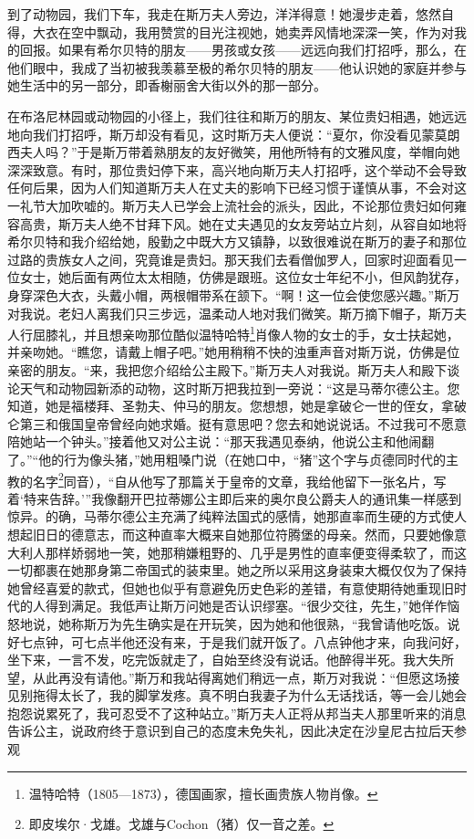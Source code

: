 \par 到了动物园，我们下车，我走在斯万夫人旁边，洋洋得意！她漫步走着，悠然自得，大衣在空中飘动，我用赞赏的目光注视她，她卖弄风情地深深一笑，作为对我的回报。如果有希尔贝特的朋友——男孩或女孩——远远向我们打招呼，那么，在他们眼中，我成了当初被我羡慕至极的希尔贝特的朋友——他认识她的家庭并参与她生活中的另一部分，即香榭丽舍大街以外的那一部分。
\par 在布洛尼林园或动物园的小径上，我们往往和斯万的朋友、某位贵妇相遇，她远远地向我们打招呼，斯万却没有看见，这时斯万夫人便说：“夏尔，你没看见蒙莫朗西夫人吗？”于是斯万带着熟朋友的友好微笑，用他所特有的文雅风度，举帽向她深深致意。有时，那位贵妇停下来，高兴地向斯万夫人打招呼，这个举动不会导致任何后果，因为人们知道斯万夫人在丈夫的影响下已经习惯于谨慎从事，不会对这一礼节大加吹嘘的。斯万夫人已学会上流社会的派头，因此，不论那位贵妇如何雍容高贵，斯万夫人绝不甘拜下风。她在丈夫遇见的女友旁站立片刻，从容自如地将希尔贝特和我介绍给她，殷勤之中既大方又镇静，以致很难说在斯万的妻子和那位过路的贵族女人之间，究竟谁是贵妇。那天我们去看僧伽罗人，回家时迎面看见一位女士，她后面有两位太太相随，仿佛是跟班。这位女士年纪不小，但风韵犹存，身穿深色大衣，头戴小帽，两根帽带系在颔下。“啊！这一位会使您感兴趣。”斯万对我说。老妇人离我们只三步远，温柔动人地对我们微笑。斯万摘下帽子，斯万夫人行屈膝礼，并且想亲吻那位酷似温特哈特\footnote{温特哈特（1805—1873），德国画家，擅长画贵族人物肖像。}肖像人物的女士的手，女士扶起她，并亲吻她。“瞧您，请戴上帽子吧。”她用稍稍不快的浊重声音对斯万说，仿佛是位亲密的朋友。“来，我把您介绍给公主殿下。”斯万夫人对我说。斯万夫人和殿下谈论天气和动物园新添的动物，这时斯万把我拉到一旁说：“这是马蒂尔德公主。您知道，她是福楼拜、圣勃夫、仲马的朋友。您想想，她是拿破仑一世的侄女，拿破仑第三和俄国皇帝曾经向她求婚。挺有意思吧？您去和她说说话。不过我可不愿意陪她站一个钟头。”接着他又对公主说：“那天我遇见泰纳，他说公主和他闹翻了。”“他的行为像头猪，”她用粗嗓门说（在她口中，“猪”这个字与贞德同时代的主教的名字\footnote{即皮埃尔·戈雄。戈雄与Cochon（猪）仅一音之差。}同音），“自从他写了那篇关于皇帝的文章，我给他留下一张名片，写着‘特来告辞。’”我像翻开巴拉蒂娜公主即后来的奥尔良公爵夫人的通讯集一样感到惊异。的确，马蒂尔德公主充满了纯粹法国式的感情，她那直率而生硬的方式使人想起旧日的德意志，而这种直率大概来自她那位符腾堡的母亲。然而，只要她像意大利人那样娇弱地一笑，她那稍嫌粗野的、几乎是男性的直率便变得柔软了，而这一切都裹在她那身第二帝国式的装束里。她之所以采用这身装束大概仅仅为了保持她曾经喜爱的款式，但她也似乎有意避免历史色彩的差错，有意使期待她重现旧时代的人得到满足。我低声让斯万问她是否认识缪塞。“很少交往，先生，”她佯作恼怒地说，她称斯万为先生确实是在开玩笑，因为她和他很熟，“我曾请他吃饭。说好七点钟，可七点半他还没有来，于是我们就开饭了。八点钟他才来，向我问好，坐下来，一言不发，吃完饭就走了，自始至终没有说话。他醉得半死。我大失所望，从此再没有请他。”斯万和我站得离她们稍远一点，斯万对我说：“但愿这场接见别拖得太长了，我的脚掌发疼。真不明白我妻子为什么无话找话，等一会儿她会抱怨说累死了，我可忍受不了这种站立。”斯万夫人正将从邦当夫人那里听来的消息告诉公主，说政府终于意识到自己的态度未免失礼，因此决定在沙皇尼古拉后天参观